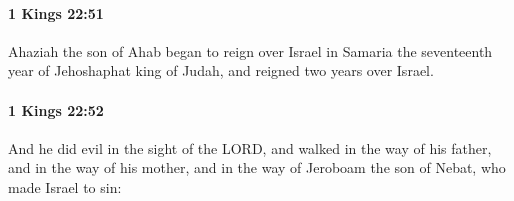 		\paragraph{1 Kings 22:51} %
			\label{1KINGS-22-51}

			Ahaziah the son of Ahab began to reign over Israel in Samaria the seventeenth year of Jehoshaphat king of Judah, and reigned two years over Israel.


		\paragraph{1 Kings 22:52} %
			\label{1KINGS-22-52}

			And he did evil in the sight of the LORD, and walked in the way of his father, and in the way of his mother, and in the way of Jeroboam the son of Nebat, who made Israel to sin:


